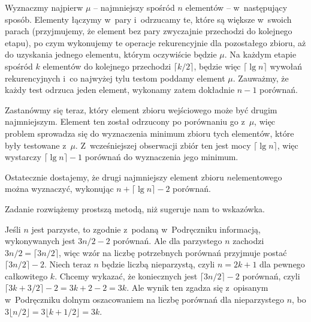
\exercise %
Wyznaczmy najpierw $\mu$ -- najmniejszy spośród $n$ elementów -- w~następujący sposób.
Elementy łączymy w~pary i~odrzucamy te, które są większe w~swoich parach (przyjmujemy, że element bez pary zwyczajnie przechodzi do kolejnego etapu), po czym wykonujemy te operacje rekurencyjnie dla pozostałego zbioru, aż do uzyskania jednego elementu, którym oczywiście będzie $\mu$.
Na każdym etapie spośród $k$ elementów do kolejnego przechodzi $\lceil k/2\rceil$, będzie więc $\lceil\lg n\rceil$ wywołań rekurencyjnych i~co najwyżej tylu testom poddamy element $\mu$.
Zauważmy, że każdy test odrzuca jeden element, wykonamy zatem dokładnie $n-1$ porównań.

Zastanówmy się teraz, który element zbioru wejściowego może być drugim najmniejszym.
Element ten został odrzucony po porównaniu go z~$\mu$, więc problem sprowadza się do wyznaczenia minimum zbioru tych elementów, które były testowane z~$\mu$.
Z~wcześniejszej obserwacji zbiór ten jest mocy $\lceil\lg n\rceil$, więc wystarczy $\lceil\lg n\rceil-1$ porównań do wyznaczenia jego minimum.

Ostatecznie dostajemy, że drugi najmniejszy element zbioru $n$\nbhyphen elementowego można wyznaczyć, wykonując $n+\lceil\lg n\rceil-2$ porównań.

\exercise %
Zadanie rozwiążemy prostszą metodą, niż sugeruje nam to wskazówka.

Jeśli $n$ jest parzyste, to zgodnie z~podaną w~Podręczniku informacją, wykonywanych jest $3n/2-2$ porównań.
Ale dla parzystego $n$ zachodzi $3n/2=\lceil3n/2\rceil$, więc wzór na liczbę potrzebnych porównań przyjmuje postać $\lceil3n/2\rceil-2$.
Niech teraz $n$ będzie liczbą nieparzystą, czyli $n=2k+1$ dla pewnego całkowitego $k$.
Chcemy wykazać, że koniecznych jest $\lceil3n/2\rceil-2$ porównań, czyli $\lceil3k+3/2\rceil-2=3k+2-2=3k$.
Ale wynik ten zgadza się z~opisanym w~Podręczniku dolnym oszacowaniem na liczbę porównań dla nieparzystego $n$, bo $3\lfloor n/2\rfloor=3\lfloor k+1/2\rfloor=3k$.
